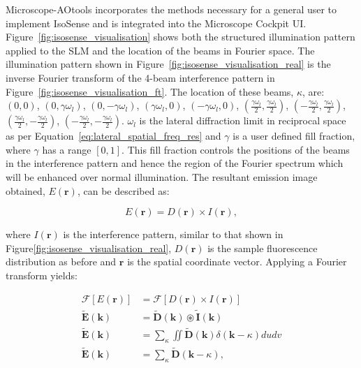 Microscope-AOtools incorporates the methods necessary for a general user to implement IsoSense and is integrated into the Microscope Cockpit UI. Figure~\ref{fig:isosense_visualisation} shows both
the structured illumination pattern applied to the SLM 
and the location of the beams in Fourier space. The illumination
pattern shown in Figure~\ref{fig:isosense_visualisation_real} is
the inverse Fourier transform of the 4-beam interference pattern 
in Figure~\ref{fig:isosense_visualisation_ft}. The location 
of these beams, $\kappa$, are: 
$(0,0)$, $(0,\gamma \omega_{l})$, $(0,-\gamma \omega_{l})$, 
$(\gamma \omega_{l}, 0)$, $(-\gamma \omega_{l}, 0)$, 
$(\frac{\gamma \omega_{l}}{2}, \frac{\gamma \omega_{l}}{2})$, 
$(-\frac{\gamma \omega_{l}}{2}, \frac{\gamma \omega_{l}}{2})$, 
$(\frac{\gamma \omega_{l}}{2}, -\frac{\gamma \omega_{l}}{2})$, 
$(-\frac{\gamma \omega_{l}}{2}, -\frac{\gamma \omega_{l}}{2})$.  
$\omega_{l}$ is the lateral diffraction limit in reciprocal space 
as per Equation~\ref{eq:lateral_spatial_freq_res} and $\gamma$ is 
a user defined fill fraction, where $\gamma$ has a range $[0, 1]$. This fill fraction controls the 
positions of the beams in the interference pattern and hence the 
region of the Fourier spectrum which will be enhanced over normal 
illumination. The resultant emission image  obtained, $E(\textbf{r})$, 
can be described as:

\begin{equation}\label{eq:isosense_real}
E(\textbf{r}) = D(\textbf{r}) \times I(\textbf{r}),
\end{equation}	

where $I(\textbf{r})$ is the interference pattern, similar to that shown in 
Figure\ref{fig:isosense_visualisation_real}, $D(\textbf{r})$ is the sample 
fluorescence distribution as before and $\textbf{r}$ is the spatial 
coordinate vector. Applying a Fourier transform yields:

\begin{equation}\label{eq:isosense_ft}
\begin{split}
\mathcal{F}[E(\textbf{r})] &= \mathcal{F}[D(\textbf{r})\times I(\textbf{r})] \\
\tilde{\textbf{E}}(\textbf{k}) &= \tilde{\textbf{D}}(\textbf{k}) \circledast \tilde{\textbf{I}}(\textbf{k}) \\
\tilde{\textbf{E}}(\textbf{k}) &= \sum_{\kappa}\iint\tilde{\textbf{D}}(\textbf{k})\delta(\textbf{k} - \kappa)dudv \\
\tilde{\textbf{E}}(\textbf{k}) &= \sum_{\kappa}\tilde{\textbf{D}}(\textbf{k} - \kappa),
\end{split}
\end{equation}

